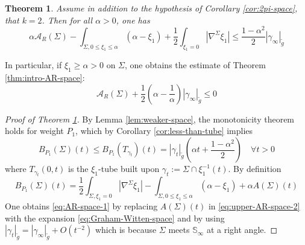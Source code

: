 \documentclass[11pt]{article}
\newtheorem{theorem}{Theorem}
\begin{document}
\begin{theorem}
\label{thm:upper-AR-space}
Assume in addition to the hypothesis of Corollary \ref{cor:2pi-space}, that \(k=2\). 
Then for all \(\alpha >0\), one has
\begin{equation}
\label{eq:AR-space-1}
 \alpha \mathcal{A}_R(\Sigma) - \int_{\Sigma, 0\leq\xi_1\leq\alpha}(\alpha-\xi_1) +
 \frac{1}{2}\int_{\xi_1=0}|\nabla^\Sigma\xi_1| \leq
 \frac{1-\alpha^2}{2}|\gamma_\infty|_{\tilde g} 
\end{equation}
\end{theorem}
In particular, if \(\xi_1 \geq \alpha >0\) on \(\Sigma\), one obtains the estimate of Theorem \ref{thm:intro-AR-space}:
\begin{equation}
\label{eq:upper-AR-space}
\mathcal{A}_R(\Sigma) + \frac{1}{2}\left(\alpha - \frac{1}{\alpha}\right)|\gamma_\infty|_{\tilde g} \leq 0  
\end{equation}
\begin{proof}[Proof of Theorem \ref{thm:upper-AR-space}]
By Lemma \ref{lem:weaker-space}, the monotonicity theorem holds for weight \(P_1\), 
which by Corollary \ref{cor:less-than-tube} implies
\begin{equation}
\label{eq:upper-AR-space-1}
B_{P_1}(\Sigma)(t) \leq B_{P_1}(T_{\gamma_t})(t) = |\gamma_t|_{\tilde g}\left(\alpha t + \frac{1-\alpha^2}{2}\right)\quad \forall t>0
\end{equation}
where \(T_{\gamma_t}(0,t)\) is the \(\xi_1\)-tube built upon \(\gamma_t:=\Sigma\cap\xi_1^{-1}(t)\). By definition
\begin{equation}
\label{eq:upper-AR-space-2}
 B_{P_1}(\Sigma)(t) =  \frac{1}{2}\int_{\Sigma,\xi_1=0}|\nabla^\Sigma\xi_1| -\int_{\Sigma,
 0\leq\xi_1\leq\alpha}(\alpha-\xi_1) + \alpha A(\Sigma)(t)
\end{equation}
One obtains \eqref{eq:AR-space-1} by replacing \(A(\Sigma)(t)\) in \eqref{eq:upper-AR-space-2}
with the expansion \eqref{eq:Graham-Witten-space} and by using \(|\gamma_t|_{\tilde g}
= |\gamma_\infty|_{\tilde g}+O(t^{-2})\) which is because \(\Sigma\) meets \(\mathbb{S}_\infty\) at a right angle. 
\end{proof}
\end{document}
